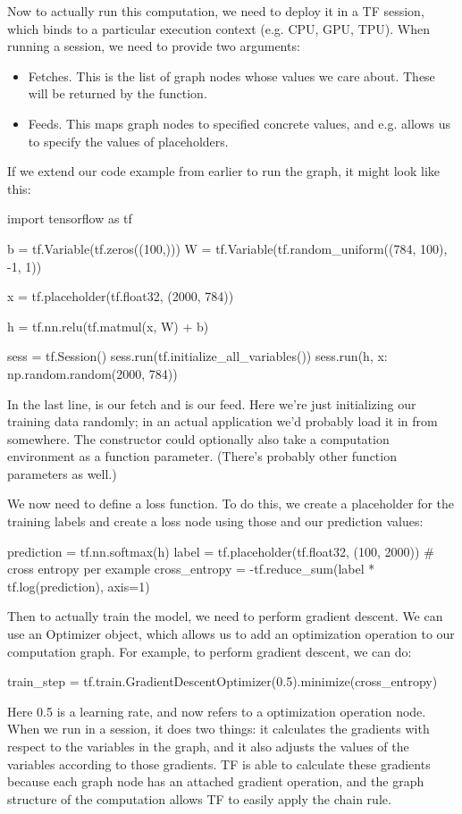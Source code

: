 Now to actually run this computation, we need to deploy it in a TF session, which binds to a particular execution context (e.g. CPU, GPU, TPU). When running a session, we need to provide two arguments:
\begin{itemize}
\item Fetches. This is the list of graph nodes whose values we care about. These will be returned by the  function.
\item Feeds. This maps graph nodes to specified concrete values, and e.g. allows us to specify the values of placeholders.
\end{itemize}
If we extend our code example from earlier to run the graph, it might look like this:
\begin{python}
import tensorflow as tf

b = tf.Variable(tf.zeros((100,)))
W = tf.Variable(tf.random_uniform((784, 100), -1, 1))

x = tf.placeholder(tf.float32, (2000, 784))

h = tf.nn.relu(tf.matmul(x, W) + b)

sess = tf.Session()
sess.run(tf.initialize_all_variables())
sess.run(h, {x: np.random.random(2000, 784)})
\end{python}
In the last line,  is our fetch and  is our feed. Here we're just initializing our training data randomly; in an actual application we'd probably load it in from somewhere. The  constructor could optionally also take a computation environment as a function parameter. (There's probably other function parameters as well.)

We now need to define a loss function. To do this, we create a placeholder for the training labels and create a loss node using those and our prediction values:
\begin{python}
prediction = tf.nn.softmax(h)
label = tf.placeholder(tf.float32, (100, 2000))
# cross entropy per example
cross_entropy = -tf.reduce_sum(label * tf.log(prediction), axis=1)
\end{python}
Then to actually train the model, we need to perform gradient descent. We can use an Optimizer object, which allows us to add an optimization operation to our computation graph. For example, to perform gradient descent, we can do:
\begin{python}
train_step = tf.train.GradientDescentOptimizer(0.5).minimize(cross_entropy)
\end{python}
Here 0.5 is a learning rate, and  now refers to a optimization operation node. When we run  in a session, it does two things: it calculates the gradients with respect to the variables in the graph, and it also adjusts the values of the variables according to those gradients. TF is able to calculate these gradients because each graph node has an attached gradient operation, and the graph structure of the computation allows TF to easily apply the chain rule.

